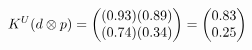 \documentclass[preview]{standalone}
\begin{document}
\begin{align*}
\special{dvisvgm:raw <g id='unique000'>}K^U(d \otimes p) = \begin{pmatrix} (0.93)(0.89) \\ (0.74)(0.34) \end{pmatrix} = \begin{pmatrix} 0.83 \\ 0.25 \end{pmatrix}\special{dvisvgm:raw </g>}
\end{align*}
\end{document}
